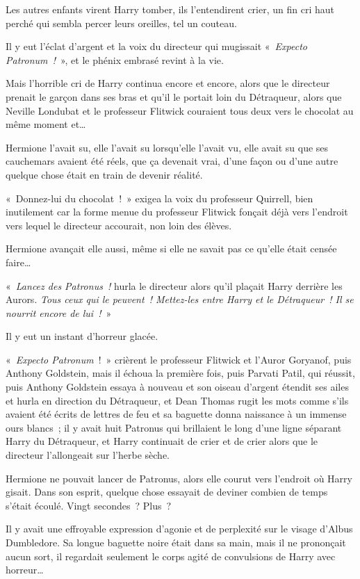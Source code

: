 \later

Les autres enfants virent Harry tomber, ils l'entendirent crier, un fin cri haut perché qui sembla percer leurs oreilles, tel un couteau.

Il y eut l'éclat d'argent et la voix du directeur qui mugissait «~\emph{Expecto Patronum~!}~», et le phénix embrasé revint à la vie.

Mais l'horrible cri de Harry continua encore et encore, alors que le directeur prenait le garçon dans ses bras et qu'il le portait loin du Détraqueur, alors que Neville Londubat et le professeur Flitwick couraient tous deux vers le chocolat au même moment et…

Hermione l'avait su, elle l'avait su lorsqu'elle l'avait vu, elle avait su que ses cauchemars avaient été réels, que ça devenait vrai, d'une façon ou d'une autre quelque chose était en train de devenir réalité.

«~Donnez-lui du chocolat~!~»
exigea la voix du professeur Quirrell, bien inutilement car la forme menue du professeur Flitwick fonçait déjà vers l'endroit vers lequel le directeur accourait, non loin des élèves.

Hermione avançait elle aussi, même si elle ne savait pas ce qu'elle était censée faire…

«~\emph{Lancez des Patronus~!} hurla le directeur alors qu'il plaçait Harry derrière les Aurors.
\emph{Tous ceux qui le peuvent~!
Mettez-les entre Harry et le Détraqueur~!
Il se nourrit encore de lui~!}~»

Il y eut un instant d'horreur glacée.

«~\emph{Expecto Patronum}~!~»
crièrent le professeur Flitwick et l'Auror Goryanof, puis Anthony Goldstein, mais il échoua la première fois, puis Parvati Patil, qui réussit, puis Anthony Goldstein essaya à nouveau et son oiseau d'argent étendit ses ailes et hurla en direction du Détraqueur, et Dean Thomas rugit les mots comme s'ils avaient été écrits de lettres de feu et sa baguette donna naissance à un immense ours blancs~; il y avait huit Patronus qui brillaient le long d'une ligne séparant Harry du Détraqueur, et Harry continuait de crier et de crier alors que le directeur l'allongeait sur l'herbe sèche.

Hermione ne pouvait lancer de Patronus, alors elle courut vers l'endroit où Harry gisait.
Dans son esprit, quelque chose essayait de deviner combien de temps s'était écoulé.
Vingt secondes~?
Plus~?

Il y avait une effroyable expression d'agonie et de perplexité sur le visage d'Albus Dumbledore.
Sa longue baguette noire était dans sa main, mais il ne prononçait aucun sort, il regardait seulement le corps agité de convulsions de Harry avec horreur…

